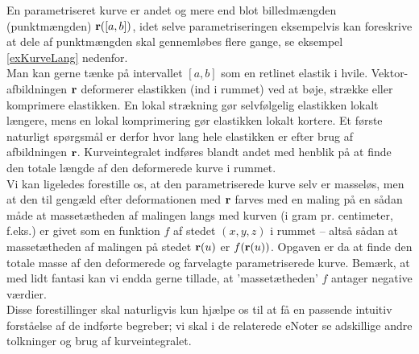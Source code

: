 \begin{think}
En parametriseret kurve er andet og mere end blot billedmængden
(punktmængden) ${\bf r}([a, b ])$, idet selve parametriseringen
eksempelvis kan foreskrive at dele af punktmængden skal gennemløbes
flere gange, se eksempel \ref{exKurveLang} nedenfor.\\

Man kan gerne tænke på intervallet $[a, b ]$ som en retlinet elastik
i hvile. Vektor-afbildningen ${\bf r}$ deformerer elastikken (ind i
rummet) ved at bøje, strække eller komprimere elastikken. En lokal
strækning gør selvfølgelig elastikken lokalt længere, mens en lokal
komprimering gør elastikken lokalt kortere. Et første naturligt
spørgsmål er derfor hvor lang hele elastikken er efter brug af
afbildningen ${\bf r}$. Kurveintegralet indføres blandt andet med
henblik på at finde den totale længde af den deformerede kurve i
rummet. \\

Vi kan ligeledes forestille os, at den parametriserede kurve selv er
masseløs, men at den til gengæld efter deformationen med ${\bf r}$
farves med en maling på en sådan måde at massetætheden af malingen
langs med kurven (i gram pr. centimeter, f.eks.) er givet som en
funktion $f$ af stedet $(x, y, z)$ i rummet -- altså sådan at
massetætheden af malingen på stedet ${\bf r}(u)$ er $f({\bf r}(u))$.
Opgaven er da at finde den totale masse af den deformerede og
farvelagte parametriserede kurve. Bemærk, at med lidt fantasi kan vi
endda gerne tillade, at 'massetætheden'  $f$ antager negative
værdier. \\

Disse forestillinger skal naturligvis kun hjælpe os til at få en passende
intuitiv forståelse af de indførte begreber; vi skal i de relaterede eNoter
se adskillige andre tolkninger og brug af kurveintegralet.

\end{think}




